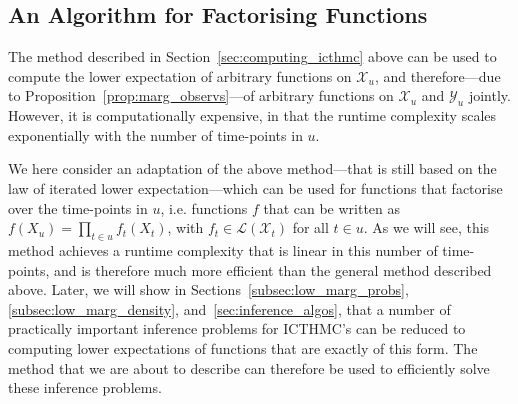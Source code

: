 \documentclass[3p]{elsarticle}
\newcommand{\states}{\mathcal{X}}
\newcommand{\observs}{\mathcal{Y}}
\newcommand{\gambles}{\mathcal{L}}
\begin{document}
\subsection{An Algorithm for Factorising Functions}

The method described in Section~\ref{sec:computing_icthmc} above can be used to compute the lower expectation of arbitrary functions on $\states_u$, and therefore---due to Proposition~\ref{prop:marg_observs}---of arbitrary functions on $\states_u$ and $\observs_u$ jointly. However, it is computationally expensive, in that the runtime complexity scales exponentially with the number of time-points in $u$.

We here consider an adaptation of the above method---that is still based on the law of iterated lower expectation---which can be used for functions that factorise over the time-points in $u$, i.e. functions $f$ that can be written as $f(X_u)= \prod_{t\in u}f_t(X_t)$, with $f_t\in\gambles(\states_t)$ for all $t\in u$. As we will see, this method achieves a runtime complexity that is linear in this number of time-points, and is therefore much more efficient than the general method described above. Later, we will show in Sections~\ref{subsec:low_marg_probs}, \ref{subsec:low_marg_density}, and~\ref{sec:inference_algos}, that a number of practically important inference problems for ICTHMC's can be reduced to computing lower expectations of functions that are exactly of this form. The method that we are about to describe can therefore be used to efficiently solve these inference problems.
\end{document}
